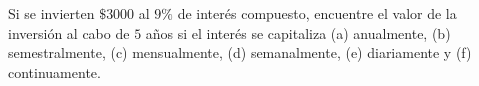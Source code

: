 \item Si se invierten $\$3000$ al $9\%$ de interés compuesto, encuentre el valor de la inversión al cabo de $5$ años si el interés se capitaliza (a) anualmente, (b) semestralmente, (c) mensualmente, (d) semanalmente, (e) diariamente y (f) continuamente.
